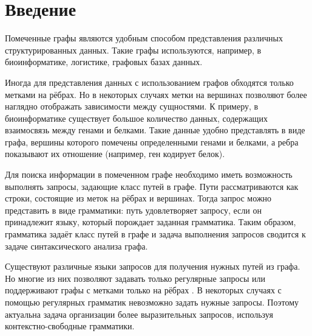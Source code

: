 \documentclass[14pt]{matmex-diploma}
\begin{document}
\maketitle
\tableofcontents
\section*{Введение}

Помеченные графы являются удобным способом представления различных структурированных данных. Такие графы используются, например, в биоинформатике, логистике, графовых базах данных.

  Иногда для представления данных с использованием графов обходятся только метками на рёбрах. Но в некоторых случаях метки на вершинах позволяют более наглядно отображать зависимости между сущностями. К примеру, в биоинформатике существует большое количество данных, содержащих взаимосвязь между генами и белками. Такие данные удобно представлять в виде графа, вершины которого помечены определенными генами и белками, а ребра показывают их отношение (например, ген кодирует белок).

  Для поиска информации в помеченном графе необходимо иметь возможность выполнять запросы, задающие класс путей в графе. Пути рассматриваются как строки, состоящие из меток на рёбрах и вершинах. Тогда запрос можно представить в виде грамматики: путь удовлетворяет запросу, если он принадлежит языку, который порождает заданная грамматика. Таким образом, грамматика задаёт класс путей в графе и задача выполнения запросов сводится к задаче синтаксического анализа графа.
  
  Существуют различные языки запросов для получения нужных путей из графа. Но многие из них позволяют задавать только регулярные запросы \cite{prud2008sparql} \cite{abiteboul1997regular} \cite{koschmieder2012regular} или поддерживают графы с метками только на рёбрах \cite{hellings2014conjunctive}. В некоторых случаях с помощью регулярных грамматик невозможно задать нужные запросы. Поэтому актуальна задача организации более выразительных запросов, используя контекстно-свободные грамматики.
\end{document}
